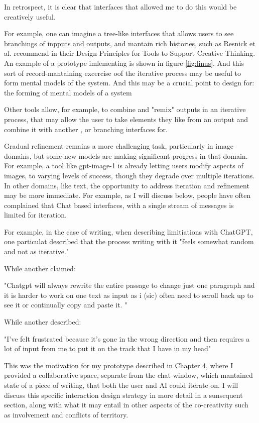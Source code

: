 In retrospect, it is clear that interfaces that allowed me to do this would be creatively useful. 

For example, one can imagine a tree-like interfaces that allows users to see branchings of inpputs and outputs, and mantain rich histories, such as Resnick et al. \cite{Resnick2005-fs} recommend in their Design Principles for Tools to Support Creative Thinking. An example of a prototype imlementing is shown in figure \ref{fig:linus}. And this sort of record-mantaining excercise oof the iterative process may be useful to form mental models of the system. And this may be a crucial point to design for: the forming of mental models of a system

Other tools allow, for example, to combine and "remix" outputs in an iterative process, that may allow the user to take elements they like from an output and combine it with another \cite{Zhou2024-vp}, or branching interfaces for. 

Gradual refinement remains a more challenging task, particularly in image domains, but some new models are making significant progress in that domain. For example, a tool like gpt-image-1 is already letting users modify aspects of images, to varying levels of success, though they degrade over multiple iterations. In other domains, like text, the opportunity to address iteration and refinement may be more immediate. For example, as I will discuss below, people have often complained that Chat based interfaces, with a single stream of messages is limited for iteration. 

For example, in the case of writing, when describing limitiations with ChatGPT, one particulat described that the process writing with it "feels somewhat random and not as iterative."

While another claimed: 

"Chatgpt will always rewrite the entire passage to change just one paragraph and it is harder to work on one text as input as i (sic) often need to scroll back up to see it or continually copy and paste it. "

While another described:

"I’ve felt frustrated because it’s gone in the wrong direction and then requires a lot of input from me to put it on the track that I have in my head"

This was the motivation for my prototype described in Chapter 4, where I provided a collaborative space, separate from the chat window, which mantained state of a piece of writing, that both the user and AI could iterate on. I will discuss this specific interaction design strategy in more detail in a sunsequent section, along with what it may entail in other aspects of the co-creativity such as involvement and conflicts of territory. 




